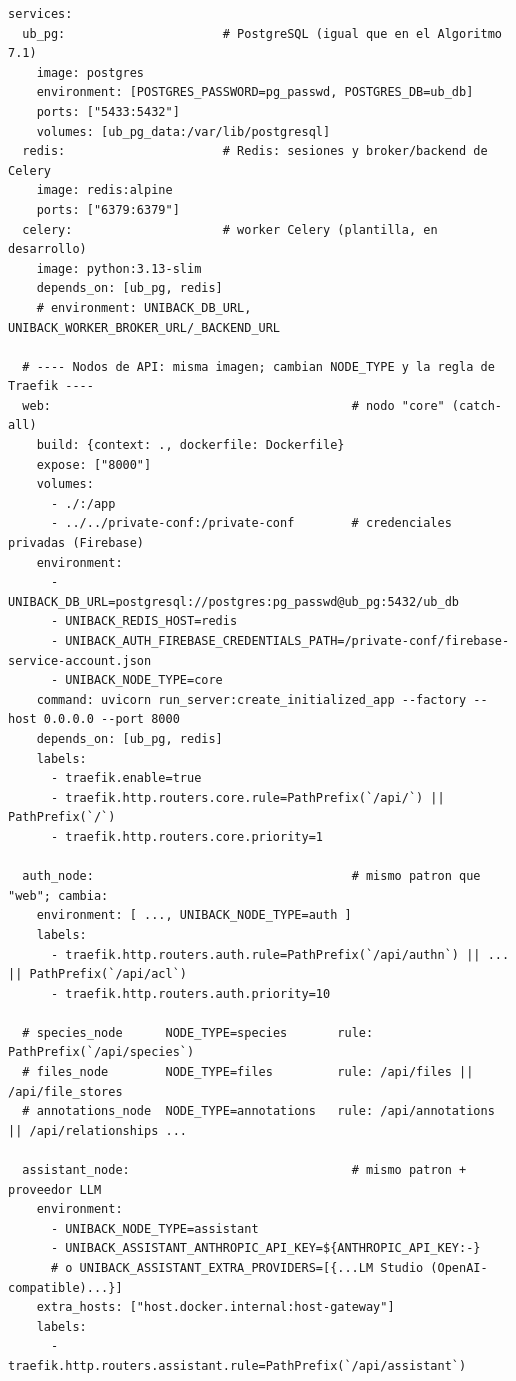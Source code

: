 \begin{lstlisting}[style=dockeryaml, caption={Docker Compose multinodo del Incremento~4 (condensado)}, label={lst:compose-multinodo}]
services:
  ub_pg:                      # PostgreSQL (igual que en el Algoritmo 7.1)
    image: postgres
    environment: [POSTGRES_PASSWORD=pg_passwd, POSTGRES_DB=ub_db]
    ports: ["5433:5432"]
    volumes: [ub_pg_data:/var/lib/postgresql]
  redis:                      # Redis: sesiones y broker/backend de Celery
    image: redis:alpine
    ports: ["6379:6379"]
  celery:                     # worker Celery (plantilla, en desarrollo)
    image: python:3.13-slim
    depends_on: [ub_pg, redis]
    # environment: UNIBACK_DB_URL, UNIBACK_WORKER_BROKER_URL/_BACKEND_URL

  # ---- Nodos de API: misma imagen; cambian NODE_TYPE y la regla de Traefik ----
  web:                                          # nodo "core" (catch-all)
    build: {context: ., dockerfile: Dockerfile}
    expose: ["8000"]
    volumes:
      - ./:/app
      - ../../private-conf:/private-conf        # credenciales privadas (Firebase)
    environment:
      - UNIBACK_DB_URL=postgresql://postgres:pg_passwd@ub_pg:5432/ub_db
      - UNIBACK_REDIS_HOST=redis
      - UNIBACK_AUTH_FIREBASE_CREDENTIALS_PATH=/private-conf/firebase-service-account.json
      - UNIBACK_NODE_TYPE=core
    command: uvicorn run_server:create_initialized_app --factory --host 0.0.0.0 --port 8000
    depends_on: [ub_pg, redis]
    labels:
      - traefik.enable=true
      - traefik.http.routers.core.rule=PathPrefix(`/api/`) || PathPrefix(`/`)
      - traefik.http.routers.core.priority=1

  auth_node:                                    # mismo patron que "web"; cambia:
    environment: [ ..., UNIBACK_NODE_TYPE=auth ]
    labels:
      - traefik.http.routers.auth.rule=PathPrefix(`/api/authn`) || ... || PathPrefix(`/api/acl`)
      - traefik.http.routers.auth.priority=10

  # species_node      NODE_TYPE=species       rule: PathPrefix(`/api/species`)
  # files_node        NODE_TYPE=files         rule: /api/files || /api/file_stores
  # annotations_node  NODE_TYPE=annotations   rule: /api/annotations || /api/relationships ...

  assistant_node:                               # mismo patron + proveedor LLM
    environment:
      - UNIBACK_NODE_TYPE=assistant
      - UNIBACK_ASSISTANT_ANTHROPIC_API_KEY=${ANTHROPIC_API_KEY:-}
      # o UNIBACK_ASSISTANT_EXTRA_PROVIDERS=[{...LM Studio (OpenAI-compatible)...}]
    extra_hosts: ["host.docker.internal:host-gateway"]
    labels:
      - traefik.http.routers.assistant.rule=PathPrefix(`/api/assistant`)


\end{lstlisting}
